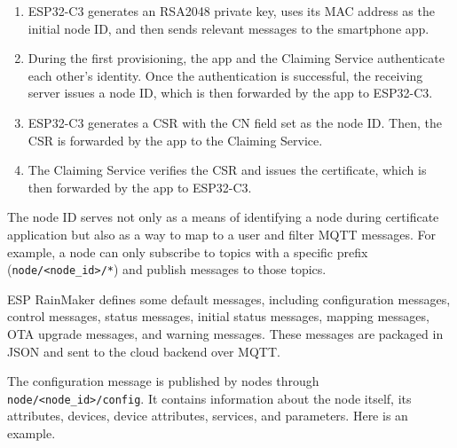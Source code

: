 \documentclass[a4paper,12pt,openany]{book}
\begin{document}
\begin{enumerate}[label=(\arabic*)]
    \item ESP32-C3 generates an RSA2048 private key, uses its MAC address as the initial node ID, and then sends relevant messages to the smartphone app.
    \item During the first provisioning, the app and the Claiming Service authenticate each other’s identity. Once the authentication is successful, the receiving server issues a node ID, which is then forwarded by the app to ESP32-C3.
    \item ESP32-C3 generates a CSR with the CN field set as the node ID. Then, the CSR is forwarded by the app to the Claiming Service.
    \item The Claiming Service verifies the CSR and issues the certificate, which is then forwarded by the app to ESP32-C3.
\end{enumerate}

The node ID serves not only as a means of identifying a node during certificate application but also as a way to map to a user and filter MQTT messages. For example, a node can only subscribe to topics with a specific prefix (\verb|node/<node_id>/*|) and publish messages to those topics.

ESP RainMaker defines some default messages, including configuration messages, control messages, status messages, initial status messages, mapping messages, OTA upgrade messages, and warning messages. These messages are packaged in JSON and sent to the cloud backend over MQTT.

The configuration message is published by nodes through \verb|node/<node_id>/config|. It contains information about the node itself, its attributes, devices, device attributes, services, and parameters. Here is an example.
\end{document}
